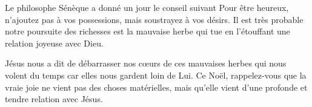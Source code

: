 Le philosophe Sénèque a donné un jour le conseil suivant\frcolon{} \Og Pour être heureux, n'ajoutez pas à vos possessions, mais soustrayez à vos désirs. \Fg{} Il est très probable notre poursuite des richesses est la mauvaise herbe qui tue en l'étouffant une relation joyeuse avec Dieu.


Jésus nous a dit de débarrasser nos cœurs de ces mauvaises herbes qui nous volent du temps car elles nous gardent loin de Lui. Ce Noël, rappelez-vous que la vraie joie ne vient pas des choses matérielles, mais qu'elle vient d'une profonde et tendre relation avec Jésus.

\pagebreak

\ornrule


\ornrule


